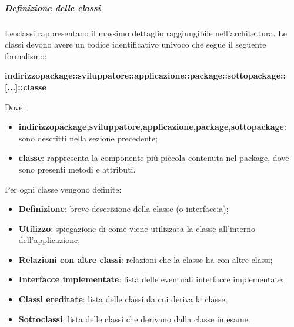 			\subparagraph{Definizione delle classi}
			Le classi rappresentano il massimo dettaglio raggiungibile nell'architettura. Le classi devono avere un codice identificativo univoco che segue il seguente formalismo:\newline
			\centerline{\textbf{indirizzo\textunderscore package::sviluppatore::applicazione::package::sottopackage::[...]::classe}}\newline
			Dove:
			\begin{itemize}
			\item \textbf{indirizzo\textunderscore package,sviluppatore,applicazione,package,sottopackage}: sono descritti nella sezione precedente;
			\item \textbf{classe}: rappresenta la componente più piccola contenuta nel package, dove sono presenti metodi e attributi.
			\end{itemize}
			Per ogni classe vengono definite:
			\begin{itemize}
			\item \textbf{Definizione}: breve descrizione della classe (o interfaccia);
			\item \textbf{Utilizzo}: spiegazione di come viene utilizzata la classe all'interno dell'applicazione;
			\item \textbf{Relazioni con altre classi}: relazioni che la classe ha con altre classi;
			\item \textbf{Interfacce implementate}: lista delle eventuali interfacce implementate;
			\item \textbf{Classi ereditate}: lista delle classi da cui deriva la classe;
			\item \textbf{Sottoclassi}: lista delle classi che derivano dalla classe in esame.
			\end{itemize}
